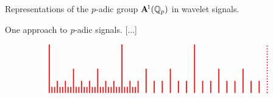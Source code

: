 \documentclass[letterpaper,11pt, reqno]{amsart}
\newtheorem{monodromy theorem}{Monodromy Theorem}[subsection]
\newtheorem{wild conjecture}[theorem]{Wild Conjecture}
\newtheorem{research objectives}{Research objectives}[subsection]
\newtheorem{research question}[theorem]{Research questions}
\newtheorem{aside question}[theorem]{Aside question}
\newtheorem{audio example}[theorem]{\loudspeaker[3] Example}
\newtheorem{blank remark}[theorem]{}
\newtheorem{terminology and comment}[theorem]{Terminology and comment}
\newtheorem{purity hypothesis}[theorem]{Purity hypothesis}
\newtheorem{corollary of the purity hypothesis}[theorem]{Corollary of the purity hypothesis}
\numberwithin{equation}{theorem}
\begin{document}
\begin{section}{Representations of the $p$-adic group $\bold{A}^{\!1}(\mathbb{Q}_{p})$ in wavelet signals.}
\begin{subsection}{One approach to {\em p}-adic signals.}
{\color{red} [...]}
	\begin{figure}[ht]
	$$
	\begin{tikzpicture}
	\draw[red, very thick] (0,0) -- (0,2);
	\draw[red, very thick] (3,0) -- (3,2);
	\draw[red, very thick] (6,0) -- (6,2);
	\draw[red, very thick, dotted] (9,0) -- (9,2);
	\draw[red, very thick] (1,0) -- (1,1);
	\draw[red, very thick] (2,0) -- (2,1);
	\draw[red, very thick] (4,0) -- (4,1);
	\draw[red, very thick] (5,0) -- (5,1);
	\draw[red, very thick] (7,0) -- (7,1);
	\draw[red, very thick] (8,0) -- (8,1);
	\draw[red, very thick] (1/3,0) -- (1/3,.5);
	\draw[red, very thick] (2/3,0) -- (2/3,.5);
	\draw[red, very thick] (1+1/3,0) -- (1+1/3,.5);
	\draw[red, very thick] (1+2/3,0) -- (1+2/3,.5);
	\draw[red, very thick] (2+1/3,0) -- (2+1/3,.5);
	\draw[red, very thick] (2+2/3,0) -- (2+2/3,.5);
	\draw[red, very thick] (3+1/3,0) -- (3+1/3,.5);
	\draw[red, very thick] (3+2/3,0) -- (3+2/3,.5);
	\draw[red, very thick] (4+1/3,0) -- (4+1/3,.5);
	\draw[red, very thick] (4+2/3,0) -- (4+2/3,.5);
	\draw[red, very thick] (5+1/3,0) -- (5+1/3,.5);
	\draw[red, very thick] (5+2/3,0) -- (5+2/3,.5);
	\draw[red, very thick] (6+1/3,0) -- (6+1/3,.5);
	\draw[red, very thick] (6+2/3,0) -- (6+2/3,.5);
	\draw[red, very thick] (7+1/3,0) -- (7+1/3,.5);
	\draw[red, very thick] (7+2/3,0) -- (7+2/3,.5);
	\draw[red, very thick] (8+1/3,0) -- (8+1/3,.5);
	\draw[red, very thick] (8+2/3,0) -- (8+2/3,.5);
	\draw[red, very thick] (1/9,0) -- (1/9,.25);
	\draw[red, very thick] (2/9,0) -- (2/9,.25);
	\draw[red, very thick] (1/3+1/9,0) -- (1/3+1/9,.25);
	\draw[red, very thick] (1/3+2/9,0) -- (1/3+2/9,.25);
	\draw[red, very thick] (2/3+1/9,0) -- (2/3+1/9,.25);
	\draw[red, very thick] (2/3+2/9,0) -- (2/3+2/9,.25);
	\draw[red, very thick] (3/3+1/9,0) -- (3/3+1/9,.25);
	\draw[red, very thick] (3/3+2/9,0) -- (3/3+2/9,.25);
	\draw[red, very thick] (4/3+1/9,0) -- (4/3+1/9,.25);
	\draw[red, very thick] (4/3+2/9,0) -- (4/3+2/9,.25);
	\draw[red, very thick] (5/3+1/9,0) -- (5/3+1/9,.25);
	\draw[red, very thick] (5/3+2/9,0) -- (5/3+2/9,.25);
	\draw[red, very thick] (6/3+1/9,0) -- (6/3+1/9,.25);
	\draw[red, very thick] (6/3+2/9,0) -- (6/3+2/9,.25);
	\draw[red, very thick] (7/3+1/9,0) -- (7/3+1/9,.25);
	\draw[red, very thick] (7/3+2/9,0) -- (7/3+2/9,.25);
	\draw[red, very thick] (8/3+1/9,0) -- (8/3+1/9,.25);
	\draw[red, very thick] (8/3+2/9,0) -- (8/3+2/9,.25);
	\draw[red, very thick] (9/3+1/9,0) -- (9/3+1/9,.25);
	\draw[red, very thick] (9/3+2/9,0) -- (9/3+2/9,.25);
	\draw[red, very thick] (10/3+1/9,0) -- (10/3+1/9,.25);
	\draw[red, very thick] (10/3+2/9,0) -- (10/3+2/9,.25);

\end{tikzpicture}$$
\end{figure}
\end{subsection}
\end{section}
\end{document}
